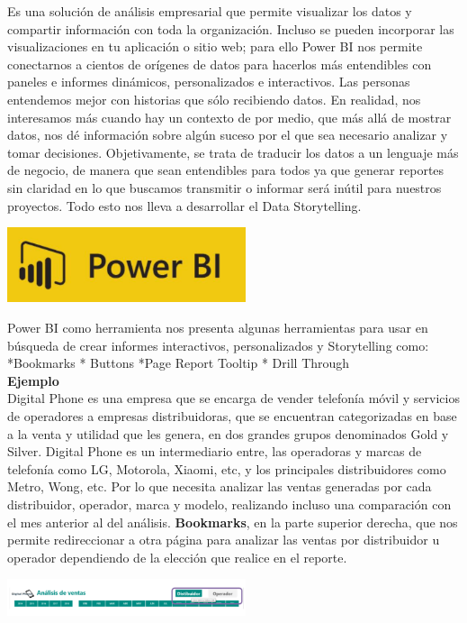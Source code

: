 \documentclass[twoside,twocolumn]{article}
\begin{document}
Es una solución de análisis empresarial que permite visualizar los datos y compartir información con toda la organización. Incluso se pueden incorporar las visualizaciones en tu aplicación o sitio web; para ello Power BI nos permite conectarnos a cientos de orígenes de datos para hacerlos más entendibles con paneles e informes dinámicos, personalizados e interactivos.
Las personas entendemos mejor con historias que sólo recibiendo datos. En realidad, nos interesamos más cuando hay un contexto de por medio, que más allá de mostrar datos, nos dé información sobre algún suceso por el que sea necesario analizar y tomar decisiones.
Objetivamente, se trata de traducir los datos a un lenguaje más de negocio, de manera que sean entendibles para todos ya que generar reportes sin claridad en lo que buscamos transmitir o informar será inútil para nuestros proyectos. Todo esto nos lleva a desarrollar el Data Storytelling.
\begin{center}
	\includegraphics[width=7cm]{./imagenes/bi.png} 
\end{center}	
Power BI como herramienta nos presenta algunas herramientas para usar en búsqueda de crear informes interactivos, personalizados y Storytelling como:
		*Bookmarks
		* Buttons
		*Page Report Tooltip
		* Drill Through\\
	

\textbf{Ejemplo}
\\Digital Phone es una empresa que se encarga de vender telefonía móvil y servicios de operadores a empresas distribuidoras, que se encuentran categorizadas en base a la venta y utilidad que les genera, en dos grandes grupos denominados Gold y Silver. Digital Phone es un intermediario entre, las operadoras y marcas de telefonía como LG, Motorola, Xiaomi, etc, y los principales distribuidores como Metro, Wong, etc. Por lo que necesita analizar las ventas generadas por cada distribuidor, operador, marca y modelo, realizando incluso una comparación con el mes anterior al del análisis.
\textbf{Bookmarks}, en la parte superior derecha, que nos permite redireccionar a otra página para analizar las ventas por distribuidor u operador dependiendo de la elección que realice en el reporte.
\begin{center}
	\includegraphics[width=7cm]{./imagenes/i3.png} 
\end{center}
\end{document}
